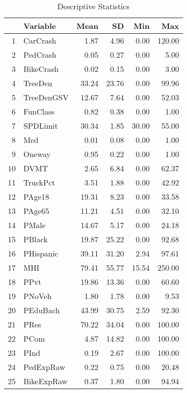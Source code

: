 \begin{table}[ht]
\centering
\begin{tabular}{rlrrrr}
  \hline
 & Variable & Mean & SD & Min & Max \\ 
  \hline
1 & CarCrash & 1.87 & 4.96 & 0.00 & 120.00 \\ 
  2 & PedCrash & 0.05 & 0.27 & 0.00 & 5.00 \\ 
  3 & BikeCrash & 0.02 & 0.15 & 0.00 & 3.00 \\ 
  4 & TreeDen & 33.24 & 23.76 & 0.00 & 99.96 \\ 
  5 & TreeDenGSV & 12.67 & 7.64 & 0.00 & 52.03 \\ 
  6 & FunClass & 0.82 & 0.38 & 0.00 & 1.00 \\ 
  7 & SPDLimit & 30.34 & 1.85 & 30.00 & 55.00 \\ 
  8 & Med & 0.01 & 0.08 & 0.00 & 1.00 \\ 
  9 & Oneway & 0.95 & 0.22 & 0.00 & 1.00 \\ 
  10 & DVMT & 2.65 & 6.84 & 0.00 & 62.37 \\ 
  11 & TruckPct & 3.51 & 1.88 & 0.00 & 42.92 \\ 
  12 & PAge18 & 19.31 & 8.23 & 0.00 & 33.58 \\ 
  13 & PAge65 & 11.21 & 4.51 & 0.00 & 32.10 \\ 
  14 & PMale & 14.67 & 5.17 & 0.00 & 24.18 \\ 
  15 & PBlack & 19.87 & 25.22 & 0.00 & 92.68 \\ 
  16 & PHispanic & 39.11 & 31.20 & 2.94 & 97.61 \\ 
  17 & MHI & 79.41 & 55.77 & 15.54 & 250.00 \\ 
  18 & PPvt & 19.86 & 13.36 & 0.00 & 60.60 \\ 
  19 & PNoVeh & 1.80 & 1.78 & 0.00 & 9.53 \\ 
  20 & PEduBach & 43.99 & 30.75 & 2.59 & 92.30 \\ 
  21 & PRes & 70.22 & 34.04 & 0.00 & 100.00 \\ 
  22 & PCom & 4.87 & 14.82 & 0.00 & 100.00 \\ 
  23 & PInd & 0.19 & 2.67 & 0.00 & 100.00 \\ 
  24 & PedExpRaw & 0.22 & 0.75 & 0.00 & 20.48 \\ 
  25 & BikeExpRaw & 0.37 & 1.80 & 0.00 & 94.94 \\ 
   \hline
\end{tabular}
\caption{Descriptive Statistics} 
\end{table}
